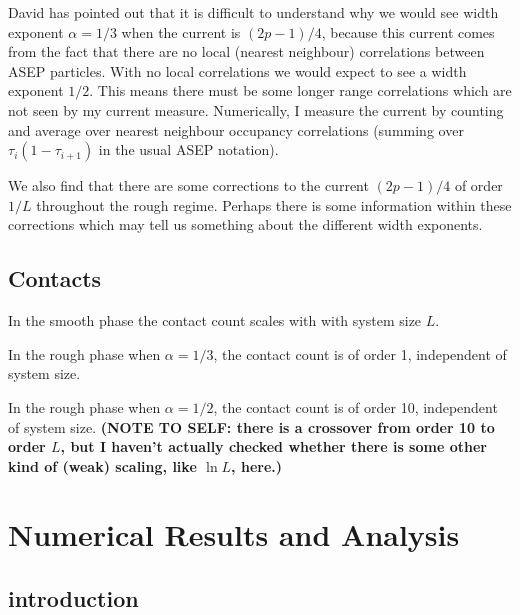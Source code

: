 \documentclass[a4paper,10pt]{article}
\begin{document}
David has pointed out that it is difficult to understand why we would see width exponent $\alpha=1/3$ when the current is $(2p-1)/4$, because this current comes from the fact that there are no local (nearest neighbour) correlations between ASEP particles. With no local correlations we would expect to see a width exponent $1/2$. This means there must be some longer range correlations which are not seen by my current measure. Numerically, I measure the current by counting and average over nearest neighbour occupancy correlations (summing over $\tau_i(1-\tau_{i+1})$ in the usual ASEP notation).

We also find that there are some corrections to the current $(2p-1)/4$ of order $1/L$ throughout the rough regime. Perhaps there is some information within these corrections which may tell us something about the different width exponents.

\subsection{Contacts}

In the smooth phase the contact count scales with with system size $L$. 

In the rough phase when $\alpha = 1/3$, the contact count is of order 1, independent of system size.

In the rough phase when $\alpha = 1/2$, the contact count is of order 10, independent of system size. {\bf (NOTE TO SELF:  there is a crossover from order 10 to order $L$, but I haven't actually checked whether there is some other kind of (weak) scaling, like $\ln L$, here.)}

\newpage
\section{Numerical Results and Analysis}

\subsection{introduction}
\end{document}
